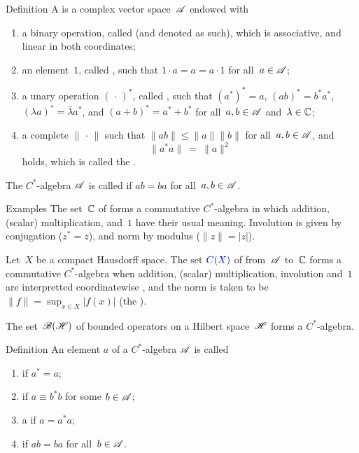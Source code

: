 \documentclass[main]{subfiles}
\begin{document}
\begin{parsec}%
\begin{point}{Definition}%
A 
is a complex vector space~$\mathscr{A}$
endowed with
\begin{enumerate}
\item
a binary operation,
called 
(and denoted as such),
which is associative, and linear in both coordinates;
\item
an element~$1$, called ,
such that $1\cdot a = a = a\cdot 1$
for all~$a\in \mathscr{A}$;
\item
a unary operation $(\,\cdot\,)^*$,
called ,
such that $(a^*)^*=a$,
$(ab)^*=b^*a^*$,
$(\lambda a)^* = \bar\lambda a^*$,
and $(a+b)^* = a^*+b^*$
for all~$a,b\in\mathscr{A}$ and~$\lambda\in \mathbb{C}$;
\item
a complete  $\|\,\cdot\,\|$
such that
$\|ab\|\leq\|a\|\|b\|$
for all~$a,b\in\mathscr{A}$,
and 
\begin{equation*}
\label{eq:Cstar-identity}
\|a^*a\|\ =\ \|a\|^2
\end{equation*}
holds, which is called the .
\end{enumerate}
The $C^*$-algebra $\mathscr{A}$ is called 
if $ab=ba$ for all~$a,b\in\mathscr{A}$.
\end{point}
\end{parsec}
\begin{parsec}%
\begin{point}{Examples}%
The set~$\mathbb{C}$ of 
forms a commutative  $C^*$-algebra
in which addition, (scalar) multiplication, and~$1$
have their usual meaning.
Involution is given by conjugation ($z^*=\bar{z}$),
and norm by modulus ($\|z\|=|z|$).
\begin{point}%
Let~$X$ be a compact Hausdorff space.
The set $\define{C(X)}$ of 
from~$\mathscr{A}$ to~$\mathbb{C}$
forms a commutative $C^*$-algebra
when addition, (scalar) multiplication, involution and~$1$ are
interpretted coordinatewise ,
and the norm is taken to be 
$\|f\|=\sup_{x\in X} |f(x)|$
(the ).
\begin{point}%
The set~$\mathscr{B}(\mathscr{H})$ of bounded operators
on a Hilbert space~$\mathscr{H}$ forms a $C^*$-algebra.
\end{point}
\end{point}
\end{point}
\end{parsec}
\begin{parsec}%
\begin{point}{Definition}
An element $a$ of a $C^*$-algebra $\mathscr{A}$ is called
\begin{enumerate}
\item {} if $a^* =a$;
\item {}
if $a\equiv b^*b$ for some $b\in \mathscr{A}$;
\item a  if $a=a^*a$;
\item {} if $ab=ba$ for all~$b\in\mathscr{A}$.
\end{enumerate}
\end{point}
\end{parsec}
\end{document}
